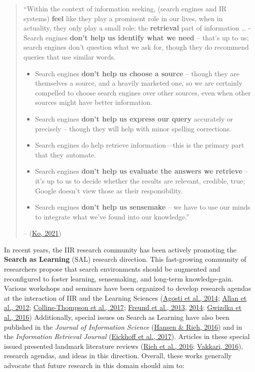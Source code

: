 \documentclass[a4paper, nobind]{templates/ociamthesis}
\begin{document}
\begin{quote}
``Within the context of information seeking, (search engines and IR systems) \textbf{feel} like they play a prominent role in our lives, when in actuality, they only play a small role: the \textbf{retrieval} part of information \ldots{}
- Search engines \textbf{don't help us identify what we need} -- that's up to us; search engines don't question what we ask for, though they do recommend queries that use similar words.

\begin{itemize}
\item
  Search engines \textbf{don't help us choose a source} -- though they are themselves a source, and a heavily marketed one, so we are certainly compelled to choose search engines over other sources, even when other sources might have better information.
\item
  Search engines \textbf{don't help us express our query} accurately or precisely -- though they will help with minor spelling corrections.
\item
  Search engines do help retrieve information---this is the primary part that they automate.
\item
  Search engines \textbf{don't help us evaluate the answers we retrieve} --
  it's up to us to decide whether the results are relevant, credible,
  true; Google doesn't view those as their responsibility.
\item
  Search engines \textbf{don't help us sensemake} -- we have to use our
  minds to integrate what we've found into our knowledge.''
\end{itemize}

-- (\protect\hyperlink{ref-ko2021seeking}{Ko, 2021})
\end{quote}

In recent years, the IIR research community has been actively promoting
the \textbf{Search as Learning} (SAL) research direction. This fast-growing
community of researchers propose that search environments should be
augmented and reconfigured to foster learning, sensemaking, and
long-term knowledge-gain. Various workshops and seminars have been
organized to develop research agendas at the interaction of IIR and the
Learning Sciences
(\protect\hyperlink{ref-agosti2014evaluation}{Agosti et al., 2014}; \protect\hyperlink{ref-allan2012frontiers}{Allan et al., 2012}; \protect\hyperlink{ref-collins2017search}{Collins-Thompson et al., 2017}; \protect\hyperlink{ref-freund2013searching}{Freund et al., 2013}, \protect\hyperlink{ref-freund2014searching}{2014}; \protect\hyperlink{ref-gwizdka2016search}{Gwizdka et al., 2016})
Additionally, special issues on Search as Learning have also been
published in the \emph{Journal of Information Science} (\protect\hyperlink{ref-hansen2016editorial}{Hansen \& Rieh, 2016})
and in the \emph{Information Retrieval Journal} (\protect\hyperlink{ref-eickhoff2017introduction}{Eickhoff et al., 2017}).
Articles in these special issued presented landmark literature reviews
(\protect\hyperlink{ref-rieh2016searching}{Rieh et al., 2016}; \protect\hyperlink{ref-vakkari2016searching}{Vakkari, 2016}), research agendas, and ideas
in this direction. Overall, these works generally advocate that future
research in this domain should aim to:
\end{document}
